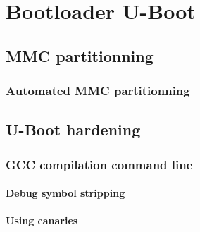 
\chapter{Bootloader U-Boot} %

\label{Chapitre 2} %


\section{MMC partitionning}

\subsection{Automated MMC partitionning}


\section{U-Boot hardening}

\subsection{GCC compilation command line}
\subsubsection{Debug symbol stripping}
\subsubsection{Using canaries}

